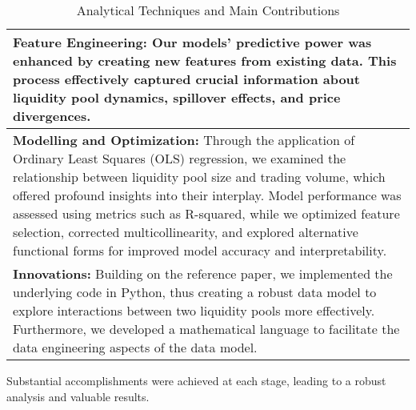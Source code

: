 \documentclass{article}
\begin{document}
{\begin{table}[htbp]
\centering
\small
\begin{tabularx}{\linewidth}{|>{\raggedright\arraybackslash}X|}
\hline
\textbf{Feature Engineering:} Our models' predictive power was enhanced by creating new features from existing data. This process effectively captured crucial information about liquidity pool dynamics, spillover effects, and price divergences. \\
\hline
\textbf{Modelling and Optimization:} Through the application of Ordinary Least Squares (OLS) regression, we examined the relationship between liquidity pool size and trading volume, which offered profound insights into their interplay. Model performance was assessed using metrics such as R-squared, while we optimized feature selection, corrected multicollinearity, and explored alternative functional forms for improved model accuracy and interpretability. \\
\hline
\textbf{Innovations:} Building on the reference paper, we implemented the underlying code in Python, thus creating a robust data model to explore interactions between two liquidity pools more effectively. Furthermore, we developed a mathematical language to facilitate the data engineering aspects of the data model. \\
\hline
\end{tabularx}
\caption{Analytical Techniques and Main Contributions}
\label{fig:analytical-techniques}
\end{table}

Substantial accomplishments were achieved at each stage, leading to a robust analysis and valuable results.

}
\end{document}
